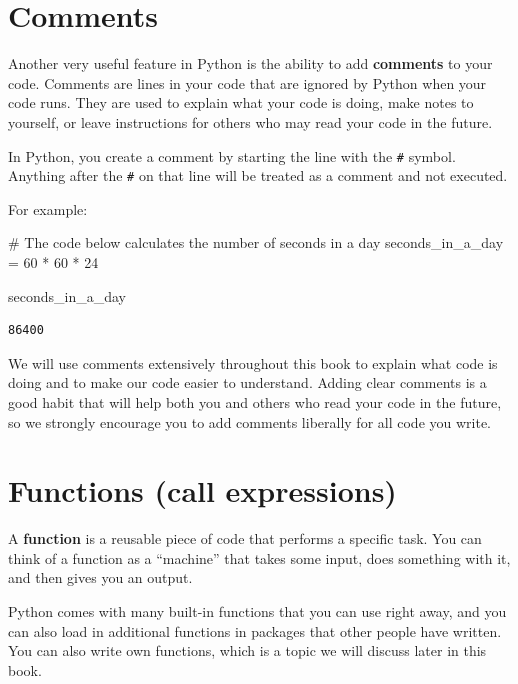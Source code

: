 \documentclass[
  letterpaper,
  DIV=11,
  numbers=noendperiod]{scrreprt}
\newenvironment{Shaded}{\begin{snugshade}}{\end{snugshade}}
\newcommand{\CommentTok}[1]{\textcolor[rgb]{0.37,0.37,0.37}{#1}}
\newcommand{\DecValTok}[1]{\textcolor[rgb]{0.68,0.00,0.00}{#1}}
\newcommand{\NormalTok}[1]{\textcolor[rgb]{0.00,0.23,0.31}{#1}}
\newcommand{\OperatorTok}[1]{\textcolor[rgb]{0.37,0.37,0.37}{#1}}
\begin{document}
\section{Comments}\label{comments}

Another very useful feature in Python is the ability to add
\textbf{comments} to your code. Comments are lines in your code that are
ignored by Python when your code runs. They are used to explain what
your code is doing, make notes to yourself, or leave instructions for
others who may read your code in the future.

In Python, you create a comment by starting the line with the
\texttt{\#} symbol. Anything after the \texttt{\#} on that line will be
treated as a comment and not executed.

For example:

\begin{Shaded}
\begin{Highlighting}[]
\CommentTok{\# The code below calculates the number of seconds in a day}
\NormalTok{seconds\_in\_a\_day }\OperatorTok{=} \DecValTok{60} \OperatorTok{*} \DecValTok{60} \OperatorTok{*} \DecValTok{24}

\NormalTok{seconds\_in\_a\_day}
\end{Highlighting}
\end{Shaded}

\begin{verbatim}
86400
\end{verbatim}

We will use comments extensively throughout this book to explain what
code is doing and to make our code easier to understand. Adding clear
comments is a good habit that will help both you and others who read
your code in the future, so we strongly encourage you to add comments
liberally for all code you write.

\section{Functions (call expressions)}\label{functions-call-expressions}

A \textbf{function} is a reusable piece of code that performs a specific
task. You can think of a function as a ``machine'' that takes some
input, does something with it, and then gives you an output.

Python comes with many built-in functions that you can use right away,
and you can also load in additional functions in packages that other
people have written. You can also write own functions, which is a topic
we will discuss later in this book.
\end{document}
